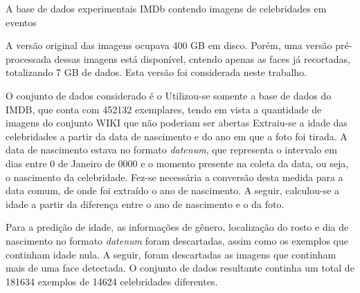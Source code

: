 A base de dados experimentais IMDb contendo imagens de celebridades em eventos

A versão original das imagens ocupava 400 GB em disco. Porém, uma versão pré-processada dessas imagens está disponível, cntendo apenas as faces já recortadas, totalizando 7 GB de dados. Esta versão foi considerada neste trabalho.


O conjunto de dados considerado é o 
Utilizou-se somente a base de dados do IMDB, que conta com 452132 exemplares, tendo em vista a quantidade de imagens do conjunto WIKI que não poderiam ser abertas
Extraiu-se a idade das celebridades a partir da data de nascimento e do ano em que a foto foi tirada. A data de nascimento estava no formato \emph{datenum}, que representa o intervalo em dias entre $0$ de Janeiro de $0000$ e o momento presente na coleta da data, ou seja, o nascimento da celebridade. Fez-se necessária a conversão desta medida para a data comum, de onde foi extraído o ano de nascimento. A seguir, calculou-se a idade a partir da diferença entre o ano de nascimento e o da foto.

Para a predição de idade, as informações de gênero, localização do rosto e dia de nascimento no formato \emph{datenum} foram descartadas, assim como os exemplos que continham idade nula. A seguir, foram descartadas as imagens que continham mais de uma face detectada. O conjunto de dados resultante continha um total de 181634 exemplos de 14624 celebridades diferentes.
